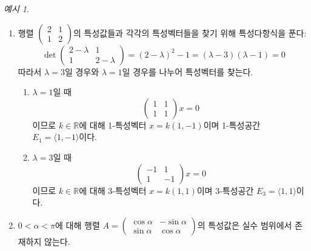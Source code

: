 \documentclass[unfonts,oneside,a4paper]{oblivoir}
\theoremstyle{definition}
\theoremstyle{theorem}
\theoremstyle{theorem}
\theoremstyle{remark}
\theoremstyle{remark}
\theoremstyle{remark}
\newtheorem*{example}{예시}
\theoremstyle{remark}
\renewcommand{\vec}[1]{\bm{\mathit{#1}}}
\newcommand{\vecz}{\bm{\mathrm{0}}}
\begin{document}
\begin{example}
    \leavevmode
    \begin{enumerate}
        \item 행렬 $\begin{pmatrix}2 & 1\\1 & 2\end{pmatrix}$의 특성값들과 각각의 특성벡터들을 찾기 위해 특성다항식을 푼다:
            \begin{equation*}
                \det
                \begin{pmatrix}
                    2 - \lambda & 1\\
                    1 & 2 - \lambda
                \end{pmatrix}
                = (2 - \lambda)^2 - 1 = (\lambda - 3)(\lambda - 1) = 0
            \end{equation*}
            따라서 $\lambda = 3$일 경우와 $\lambda = 1$일 경우를 나누어 특성벡터를 찾는다.
            \begin{enumerate}
                \item $\lambda = 1$일 때
                    \begin{equation*}
                        \begin{pmatrix}
                            1 & 1\\
                            1 & 1
                        \end{pmatrix}
                        \vec x = \vecz
                    \end{equation*}
                    이므로 $k \in \mathbb R$에 대해 1-특성벡터 $\vec x = k(1, -1)$이며 1-특성공간 $E_1 = \langle 1, -1 \rangle$이다.
                \item $\lambda = 3$일 때
                    \begin{equation*}
                        \begin{pmatrix}
                            -1 & 1\\
                            1 & -1
                        \end{pmatrix}
                        \vec x = \vecz
                    \end{equation*}
                    이므로 $k \in \mathbb R$에 대해 3-특성벡터 $\vec x = k(1, 1)$이며 3-특성공간 $E_3 = \langle 1, 1 \rangle$이다.
            \end{enumerate}
        \item $0 < \alpha < \pi$에 대해 행렬 $A = \begin{pmatrix}\cos \alpha & -\sin \alpha\\\sin \alpha & \cos \alpha\end{pmatrix}$의 특성값은 실수 범위에서 존재하지 않는다.

\end{enumerate}
\end{example}
\end{document}
